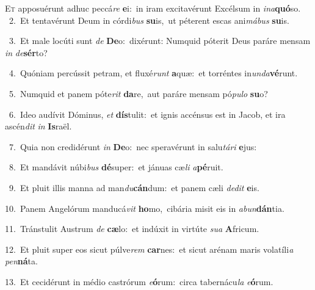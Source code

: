 \lettrine{\initial\textcolor{\initialcolor}{E}}{t} apposuérunt adhuc peccá\textit{re} \textbf{e}\-i:~\star in iram excitavérunt Excélsum in \textit{in}\-\textit{a}\textbf{quó}so.\\
{\numbfont\textcolor{\numbcolor}{~2.}}~Et tentavérunt Deum in córdi\textit{bus} \textbf{su}\-is,~\star ut péterent escas ani\-\textit{má}\-\textit{bus} \textbf{su}\-is.\par
{\numbfont\textcolor{\numbcolor}{~3.}}~Et male locúti sunt \textit{de} \textbf{De}\-o:~\star dixérunt: Numquid póterit Deus paráre mensam \textit{in} \textit{de}\-\textbf{sér}to?\par
{\numbfont\textcolor{\numbcolor}{~4.}}~Quóniam percússit petram, et fluxé\textit{runt} \textbf{a}\-quæ:~\star et torréntes in\-\textit{un}\-\textit{da}\textbf{vé}runt.\par
{\numbfont\textcolor{\numbcolor}{~5.}}~Numquid et panem póte\textit{rit} \textbf{da}\-re,~\star aut paráre mensam pó\-\textit{pu}\-\textit{lo} \textbf{su}\-o?\par
{\numbfont\textcolor{\numbcolor}{~6.}}~Ideo audívit Dóminus, \textit{et} \textbf{dís}\-tulit:~\star et ignis accénsus est in Jacob, et ira ascén\textit{dit} \textit{in} \textbf{Is}\-raël.\par
{\numbfont\textcolor{\numbcolor}{~7.}}~Quia non credidérunt \textit{in} \textbf{De}\-o:~\star nec speravérunt in salu\-\textit{tá}\-\textit{ri} \textbf{e}\-jus:\par
{\numbfont\textcolor{\numbcolor}{~8.}}~Et mandávit núbi\textit{bus} \textbf{dé}\-super:~\star et jánuas cæ\textit{li} \textit{a}\-\textbf{pé}ruit.\par
{\numbfont\textcolor{\numbcolor}{~9.}}~Et pluit illis manna ad man\-\textit{du}\-\textbf{cán}dum:~\star et panem cæli \textit{de}\-\textit{dit} \textbf{e}\-is.\par
{\numbfont\textcolor{\numbcolor}{10.}}~Panem Angelórum manducá\textit{vit} \textbf{ho}\-mo,~\star cibária misit eis in \textit{ab}\-\textit{un}\textbf{dán}tia.\par
{\numbfont\textcolor{\numbcolor}{11.}}~Tránstulit Austrum \textit{de} \textbf{cæ}\-lo:~\star et indúxit in virtúte \textit{su}\-\textit{a} \textbf{A}\-fricum.\par
{\numbfont\textcolor{\numbcolor}{12.}}~Et pluit super eos sicut púlve\textit{rem} \textbf{car}\-nes:~\star et sicut arénam maris volatíli\textit{a} \textit{pen}\-\textbf{ná}ta.\par
{\numbfont\textcolor{\numbcolor}{13.}}~Et cecidérunt in médio castrórum \textit{e}\-\textbf{ó}rum:~\star circa tabernácu\textit{la} \textit{e}\-\textbf{ó}rum.\par
